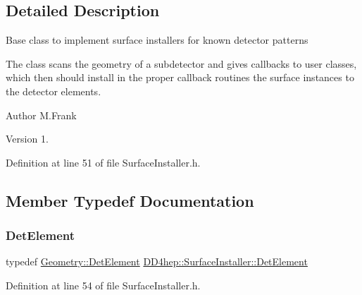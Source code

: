 \subsection{Detailed Description}
Base class to implement surface installers for known detector patterns

The class scans the geometry of a subdetector and gives callbacks to user classes, which then should install in the proper callback routines the surface instances to the detector elements.

\begin{DoxyAuthor}{Author}
M.\+Frank 
\end{DoxyAuthor}
\begin{DoxyVersion}{Version}
1. 
\end{DoxyVersion}


Definition at line 51 of file Surface\+Installer.\+h.



\subsection{Member Typedef Documentation}
\hypertarget{class_d_d4hep_1_1_surface_installer_ab88f41bd9efd54b4b67baee892bfa926}{}\label{class_d_d4hep_1_1_surface_installer_ab88f41bd9efd54b4b67baee892bfa926} 
\subsubsection{\texorpdfstring{Det\+Element}{DetElement}}
{\footnotesize\ttfamily typedef \hyperlink{class_d_d4hep_1_1_geometry_1_1_det_element}{Geometry\+::\+Det\+Element} \hyperlink{class_d_d4hep_1_1_surface_installer_ab88f41bd9efd54b4b67baee892bfa926}{D\+D4hep\+::\+Surface\+Installer\+::\+Det\+Element}\hspace{0.3cm}{\ttfamily [protected]}}



Definition at line 54 of file Surface\+Installer.\+h.

\hypertarget{class_d_d4hep_1_1_surface_installer_a731a72c192bdf217f206f0a04ff9dea7}{}\label{class_d_d4hep_1_1_surface_installer_a731a72c192bdf217f206f0a04ff9dea7} 
